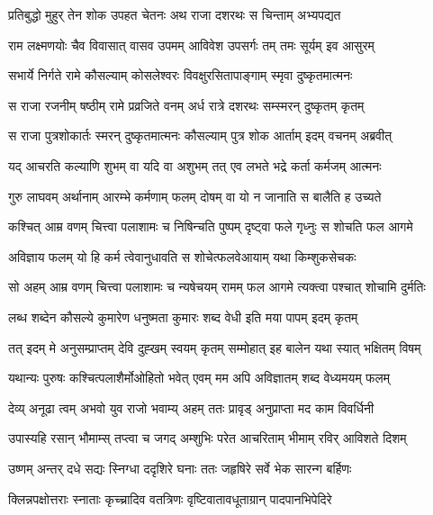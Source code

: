 
\twolineshloka
{प्रतिबुद्धो मुहुर् तेन शोक उपहत चेतनः}
{अथ राजा दशरथः स चिन्ताम् अभ्यपद्यत} %

\twolineshloka
{राम लक्ष्मणयोः चैव विवासात् वासव उपमम्}
{आविवेश उपसर्गः तम् तमः सूर्यम् इव आसुरम्} %

\twolineshloka
{सभार्ये निर्गते रामे कौसल्याम् कोसलेश्वरः}
{विवक्षुरसितापाङ्गाम् स्मृवा दुष्कृतमात्मनः} %

\twolineshloka
{स राजा रजनीम् षष्ठीम् रामे प्रव्रजिते वनम्}
{अर्ध रात्रे दशरथः सम्स्मरन् दुष्कृतम् कृतम्} %

\twolineshloka
{स राजा पुत्रशोकार्तः स्मरन् दुष्कृतमात्मनः}
{कौसल्याम् पुत्र शोक आर्ताम् इदम् वचनम् अब्रवीत्} %

\twolineshloka
{यद् आचरति कल्याणि शुभम् वा यदि वा अशुभम्}
{तत् एव लभते भद्रे कर्ता कर्मजम् आत्मनः} %

\twolineshloka
{गुरु लाघवम् अर्थानाम् आरम्भे कर्मणाम् फलम्}
{दोषम् वा यो न जानाति स बालैति ह उच्यते} %

\twolineshloka
{कश्चित् आम्र वणम् चित्त्वा पलाशामः च निषिन्चति}
{पुष्पम् दृष्ट्वा फले गृध्नुः स शोचति फल आगमे} %

\twolineshloka
{अविज्ञाय फलम् यो हि कर्म त्वेवानुधावति}
{स शोचेत्फलवेआयाम् यथा किम्शुकसेचकः} %

\twolineshloka
{सो अहम् आम्र वणम् चित्त्वा पलाशामः च न्यषेचयम्}
{रामम् फल आगमे त्यक्त्वा पश्चात् शोचामि दुर्मतिः} %

\twolineshloka
{लब्ध शब्देन कौसल्ये कुमारेण धनुष्मता}
{कुमारः शब्द वेधी इति मया पापम् इदम् कृतम्} %

\twolineshloka
{तत् इदम् मे अनुसम्प्राप्तम् देवि दुह्खम् स्वयम् कृतम्}
{सम्मोहात् इह बालेन यथा स्यात् भक्षितम् विषम्} %

\twolineshloka
{यथान्यः पुरुषः कश्चित्पलाशैर्मोओहितो भवेत्}
{एवम् मम अपि अविज्ञातम् शब्द वेध्यमयम् फलम्} %

\twolineshloka
{देव्य् अनूढा त्वम् अभवो युव राजो भवाम्य् अहम्}
{ततः प्रावृड् अनुप्राप्ता मद काम विवर्धिनी} %

\twolineshloka
{उपास्यहि रसान् भौमाम्स् तप्त्वा च जगद् अम्शुभिः}
{परेत आचरिताम् भीमाम् रविर् आविशते दिशम्} %

\twolineshloka
{उष्णम् अन्तर् दधे सद्यः स्निग्धा ददृशिरे घनाः}
{ततः जहृषिरे सर्वे भेक सारन्ग बर्हिणः} %

\twolineshloka
{क्लिन्नपक्षोत्तराः स्नाताः कृच्च्रादिव वतत्रिणः}
{वृष्टिवातावधूताग्रान् पादपानभिपेदिरे} %

